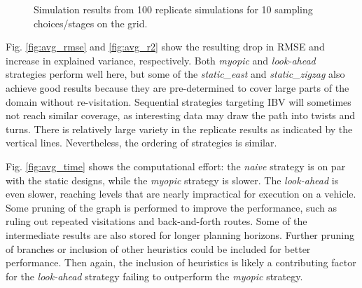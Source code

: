 \documentclass[aoas]{imsart}
\begin{document}
\begin{figure}[h!]
  \hfill 
\caption{Simulation results from 100 replicate simulations for 10
  sampling choices/stages on the grid. }  
\label{fig:sim_results}
\end{figure}

Fig. \ref{fig:avg_rmse} and \ref{fig:avg_r2} show the resulting drop
in RMSE and increase in explained variance, respectively. Both
\textit{myopic} and \textit{look-ahead} strategies perform well here,
but some of the \textit{static\_east} and \textit{static\_zigzag} also
achieve good results because they are pre-determined to cover large
parts of the domain without re-visitation. Sequential strategies
targeting IBV will sometimes not reach similar coverage, as
interesting data may draw the path into twists and turns. There is
relatively large variety in the replicate results as indicated by the
vertical lines. Nevertheless, the ordering of strategies is similar.


Fig. \ref{fig:avg_time} shows the computational effort: the
\textit{naive} strategy is on par with the static designs, while the
\textit{myopic} strategy is slower. The \textit{look-ahead} is even
slower, reaching levels that are nearly impractical for execution on a
vehicle. Some pruning of the graph is performed to improve the
performance, such as ruling out repeated visitations and
back-and-forth routes. Some of the intermediate results are also
stored for longer planning horizons. Further pruning of branches or
inclusion of other heuristics could be included for better
performance. Then again, the inclusion of heuristics is likely a
contributing factor for the \textit{look-ahead} strategy failing to
outperform the \textit{myopic} strategy.
\end{document}
